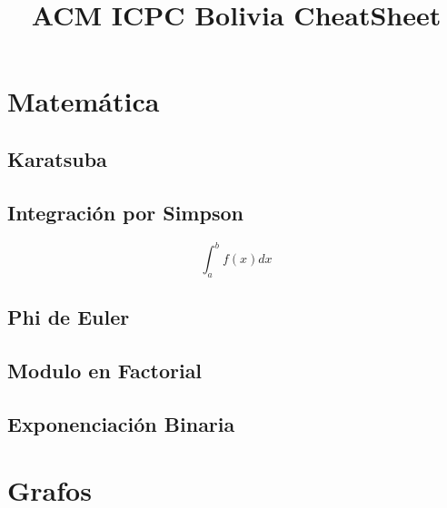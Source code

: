 \documentclass[10pt,letterpaper]{article}
\begin{document}
\title{ACM ICPC Bolivia CheatSheet}
\author{}
\date{}
\maketitle
\newpage

\tableofcontents
{}
\section{Matem\'atica}

\subsection{Karatsuba}

\subsection{Integraci\'on por Simpson}
$$
\int_a^b f(x) dx
$$

\subsection{Phi de Euler}

\subsection{Modulo en Factorial}

\subsection{Exponenciaci\'on Binaria}

\section{Grafos}
\end{document}

